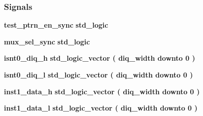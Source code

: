 \subsubsection*{Signals}
 \begin{DoxyCompactItemize}
\item 
{\bf test\+\_\+ptrn\+\_\+en\+\_\+sync} {\bfseries \textcolor{comment}{std\+\_\+logic}\textcolor{vhdlchar}{ }} 
\item 
{\bf mux\+\_\+sel\+\_\+sync} {\bfseries \textcolor{comment}{std\+\_\+logic}\textcolor{vhdlchar}{ }} 
\item 
{\bf isnt0\+\_\+diq\+\_\+h} {\bfseries \textcolor{comment}{std\+\_\+logic\+\_\+vector}\textcolor{vhdlchar}{ }\textcolor{vhdlchar}{(}\textcolor{vhdlchar}{ }\textcolor{vhdlchar}{ }\textcolor{vhdlchar}{ }\textcolor{vhdlchar}{ }{\bfseries {\bf diq\+\_\+width}} \textcolor{vhdlchar}{ }\textcolor{keywordflow}{downto}\textcolor{vhdlchar}{ }\textcolor{vhdlchar}{ } \textcolor{vhdldigit}{0} \textcolor{vhdlchar}{ }\textcolor{vhdlchar}{)}\textcolor{vhdlchar}{ }} 
\item 
{\bf isnt0\+\_\+diq\+\_\+l} {\bfseries \textcolor{comment}{std\+\_\+logic\+\_\+vector}\textcolor{vhdlchar}{ }\textcolor{vhdlchar}{(}\textcolor{vhdlchar}{ }\textcolor{vhdlchar}{ }\textcolor{vhdlchar}{ }\textcolor{vhdlchar}{ }{\bfseries {\bf diq\+\_\+width}} \textcolor{vhdlchar}{ }\textcolor{keywordflow}{downto}\textcolor{vhdlchar}{ }\textcolor{vhdlchar}{ } \textcolor{vhdldigit}{0} \textcolor{vhdlchar}{ }\textcolor{vhdlchar}{)}\textcolor{vhdlchar}{ }} 
\item 
{\bf inst1\+\_\+data\+\_\+h} {\bfseries \textcolor{comment}{std\+\_\+logic\+\_\+vector}\textcolor{vhdlchar}{ }\textcolor{vhdlchar}{(}\textcolor{vhdlchar}{ }\textcolor{vhdlchar}{ }\textcolor{vhdlchar}{ }\textcolor{vhdlchar}{ }{\bfseries {\bf diq\+\_\+width}} \textcolor{vhdlchar}{ }\textcolor{keywordflow}{downto}\textcolor{vhdlchar}{ }\textcolor{vhdlchar}{ } \textcolor{vhdldigit}{0} \textcolor{vhdlchar}{ }\textcolor{vhdlchar}{)}\textcolor{vhdlchar}{ }} 
\item 
{\bf inst1\+\_\+data\+\_\+l} {\bfseries \textcolor{comment}{std\+\_\+logic\+\_\+vector}\textcolor{vhdlchar}{ }\textcolor{vhdlchar}{(}\textcolor{vhdlchar}{ }\textcolor{vhdlchar}{ }\textcolor{vhdlchar}{ }\textcolor{vhdlchar}{ }{\bfseries {\bf diq\+\_\+width}} \textcolor{vhdlchar}{ }\textcolor{keywordflow}{downto}\textcolor{vhdlchar}{ }\textcolor{vhdlchar}{ } \textcolor{vhdldigit}{0} \textcolor{vhdlchar}{ }\textcolor{vhdlchar}{)}\textcolor{vhdlchar}{ }} 
\item 

\end{DoxyCompactItemize}
